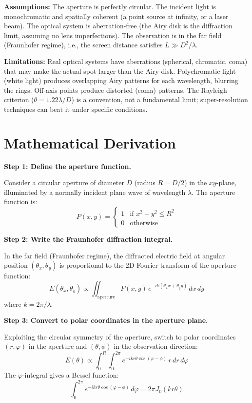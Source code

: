 \textbf{Assumptions:} The aperture is perfectly circular. The incident light is monochromatic and spatially coherent (a point source at infinity, or a laser beam). The optical system is aberration-free (the Airy disk is the diffraction limit, assuming no lens imperfections). The observation is in the far field (Fraunhofer regime), i.e., the screen distance satisfies $L \gg D^2/\lambda$.


\textbf{Limitations:} Real optical systems have aberrations (spherical, chromatic, coma) that may make the actual spot larger than the Airy disk. Polychromatic light (white light) produces overlapping Airy patterns for each wavelength, blurring the rings. Off-axis points produce distorted (coma) patterns. The Rayleigh criterion ($\theta = 1.22\lambda/D$) is a convention, not a fundamental limit; super-resolution techniques can beat it under specific conditions.


\section*{Mathematical Derivation}

\textbf{Step 1: Define the aperture function.}

Consider a circular aperture of diameter $D$ (radius $R = D/2$) in the $xy$-plane, illuminated by a normally incident plane wave of wavelength $\lambda$. The aperture function is:
\begin{equation}
P(x,y) = \begin{cases} 1 & \text{if } x^2 + y^2 \leq R^2 \\ 0 & \text{otherwise} \end{cases}
\end{equation}

\textbf{Step 2: Write the Fraunhofer diffraction integral.}

In the far field (Fraunhofer regime), the diffracted electric field at angular position $(\theta_x, \theta_y)$ is proportional to the 2D Fourier transform of the aperture function:
\begin{equation}
E(\theta_x, \theta_y) \propto \iint_{\text{aperture}} P(x,y)\,e^{-i k(\theta_x x + \theta_y y)}\,dx\,dy
\end{equation}
where $k = 2\pi/\lambda$.

\textbf{Step 3: Convert to polar coordinates in the aperture plane.}

Exploiting the circular symmetry of the aperture, switch to polar coordinates $(r,\varphi)$ in the aperture and $(\theta,\phi)$ in the observation direction:
\begin{equation}
E(\theta) \propto \int_0^R \int_0^{2\pi} e^{-ikr\theta\cos(\varphi-\phi)}\,r\,dr\,d\varphi
\end{equation}
The $\varphi$-integral gives a Bessel function:
\begin{equation}
\int_0^{2\pi} e^{-ikr\theta\cos(\varphi-\phi)}\,d\varphi = 2\pi J_0(kr\theta)
\end{equation}

